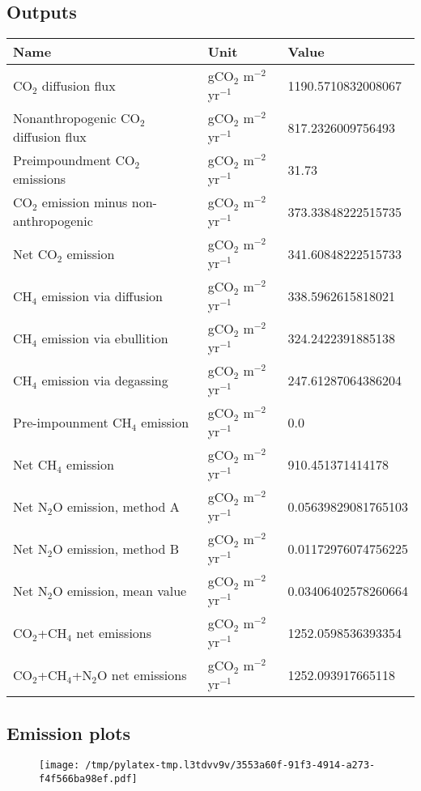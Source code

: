 \documentclass{article}%
\begin{document}
%
\subsection{Outputs}%
\label{subsec:Outputs}%
\begin{center}%
\renewcommand{\arraystretch}{1.0}%
\begin{tabu}{@{}p{10cm} X[c] X[l]@{}}%
\toprule%
\textbf{Name}&\textbf{Unit}&\textbf{Value}\\%
\midrule%
CO$_2$ diffusion flux&gCO$_2$ m$^{-2}$ yr$^{-1}$&\num[round-precision=4,round-mode=figures]{1190.5710832008067}\\%
Nonanthropogenic CO$_2$ diffusion flux&gCO$_2$ m$^{-2}$ yr$^{-1}$&\num[round-precision=4,round-mode=figures]{817.2326009756493}\\%
Preimpoundment CO$_2$ emissions&gCO$_2$ m$^{-2}$ yr$^{-1}$&\num[round-precision=4,round-mode=figures]{31.73}\\%
CO$_2$ emission minus non-anthropogenic&gCO$_2$ m$^{-2}$ yr$^{-1}$&\num[round-precision=4,round-mode=figures]{373.33848222515735}\\%
Net CO$_2$ emission&gCO$_2$ m$^{-2}$ yr$^{-1}$&\num[round-precision=4,round-mode=figures]{341.60848222515733}\\%
CH$_4$ emission via diffusion&gCO$_2$ m$^{-2}$ yr$^{-1}$&\num[round-precision=4,round-mode=figures]{338.5962615818021}\\%
CH$_4$ emission via ebullition&gCO$_2$ m$^{-2}$ yr$^{-1}$&\num[round-precision=4,round-mode=figures]{324.2422391885138}\\%
CH$_4$ emission via degassing&gCO$_2$ m$^{-2}$ yr$^{-1}$&\num[round-precision=4,round-mode=figures]{247.61287064386204}\\%
Pre-impounment CH$_4$ emission&gCO$_2$ m$^{-2}$ yr$^{-1}$&\num[round-precision=4,round-mode=figures]{0.0}\\%
Net CH$_4$ emission&gCO$_2$ m$^{-2}$ yr$^{-1}$&\num[round-precision=4,round-mode=figures]{910.451371414178}\\%
Net N$_2$O emission, method A&gCO$_2$ m$^{-2}$ yr$^{-1}$&\num[round-precision=4,round-mode=figures]{0.05639829081765103}\\%
Net N$_2$O emission, method B&gCO$_2$ m$^{-2}$ yr$^{-1}$&\num[round-precision=4,round-mode=figures]{0.01172976074756225}\\%
Net N$_2$O emission, mean value&gCO$_2$ m$^{-2}$ yr$^{-1}$&\num[round-precision=4,round-mode=figures]{0.03406402578260664}\\%
\midrule%
CO$_2$+CH$_4$ net emissions&gCO$_2$ m$^{-2}$ yr$^{-1}$&\num[round-precision=4,round-mode=figures]{1252.0598536393354}\\%
\midrule%
CO$_2$+CH$_4$+N$_2$O net emissions&gCO$_2$ m$^{-2}$ yr$^{-1}$&\num[round-precision=4,round-mode=figures]{1252.093917665118}\\\bottomrule%
%
\end{tabu}%
\end{center}%
\subsection{Emission plots}%
\label{subsec:Emissionplots}%


\begin{figure}[htbp]%
\centering%
\texttt{[image: /tmp/pylatex-tmp.l3tdvv9v/3553a60f-91f3-4914-a273-f4f566ba98ef.pdf]}%
\end{figure}

%
\end{document}
